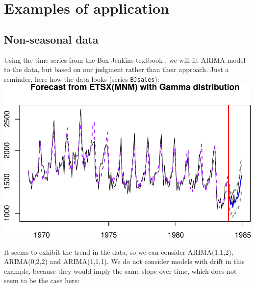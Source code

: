 \documentclass[
]{book}
\theoremstyle{definition}
\theoremstyle{definition}
\theoremstyle{definition}
\theoremstyle{definition}
\theoremstyle{remark}
\begin{document}
\hypertarget{ARIMAExampleInR}{%
\section{Examples of application}\label{ARIMAExampleInR}}

\hypertarget{non-seasonal-data-2}{%
\subsection{Non-seasonal data}\label{non-seasonal-data-2}}

Using the time series from the Box-Jenkins textbook \citep{Box1976}, we will fit ARIMA model to the data, but based on our judgment rather than their approach. Just a reminder, here how the data looks (series \texttt{BJsales}):
\includegraphics{adam_files/figure-latex/unnamed-chunk-58-1.pdf}

It seems to exhibit the trend in the data, so we can consider ARIMA(1,1,2), ARIMA(0,2,2) and ARIMA(1,1,1). We do not consider models with drift in this example, because they would imply the same slope over time, which does not seem to be the case here:
\end{document}
